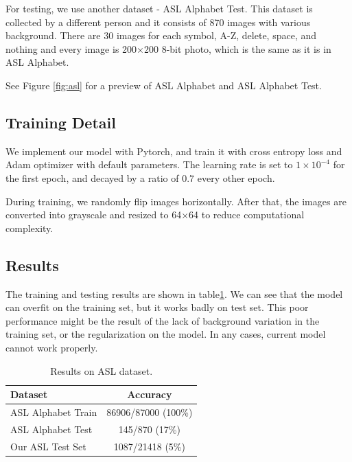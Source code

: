 \documentclass[10pt,twocolumn,letterpaper]{article}
\begin{document}
For testing, we use another dataset - ASL Alphabet Test\cite{noauthor_asl_nodate-1}. This dataset is collected by a different person and it consists of 870 images with various background. There are 30 images for each symbol, A-Z, delete, space, and nothing and every image is 200$\times$200 8-bit photo, which is the same as it is in ASL Alphabet. 

See Figure \ref{fig:asl} for a preview of ASL Alphabet and ASL Alphabet Test.

\subsection{Training Detail}\label{sec:training_detail}

We implement our model with Pytorch, and train it with cross entropy loss and Adam optimizer\cite{kingma2014adam} with default parameters. The learning rate is set to $1\times 10^{-4}$ for the first epoch, and decayed by a ratio of 0.7 every other epoch. 

During training, we randomly flip images horizontally. After that, the images are converted into grayscale and resized to 64$\times$64 to reduce computational complexity. 

\subsection{Results}

The training and testing results are shown in table\ref{table:result}. We can see   that the model can overfit on the training set, but it works badly on test set. This poor performance might be the result of the lack of background variation in the training set, or the regularization on the model. In any cases, current model cannot work properly.

\begin{table}[h]
\begin{center}
\begin{tabular}{|l|c|}
\hline
Dataset & Accuracy \\
\hline\hline
ASL Alphabet Train & 86906/87000 (100\%) \\
ASL Alphabet Test & 145/870 (17\%) \\
Our ASL Test Set & 1087/21418 (5\%) \\
\hline
\end{tabular}
\end{center}
\caption{Results on ASL dataset.}
\label{table:result}
\end{table}
\end{document}
